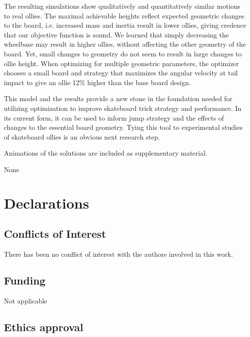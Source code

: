 \documentclass[default,iicol,pdflatex]{sn-jnl}
\begin{document}
The resulting simulations show qualitatively and quantitatively similar motions to real ollies. The maximal achievable heights reflect expected geometric changes to the board, i.e. increased mass and inertia result in lower ollies, giving credence that our objective function is sound. We learned that simply decreasing the wheelbase may result in higher ollies, without affecting the other geometry of the board. Yet, small changes to geometry do not seem to result in large changes to ollie height. When optimizing for multiple geometric parameters, the optimizer chooses a small board and strategy that maximizes the angular velocity at tail impact to give an ollie 12\% higher than the base board design.

This model and the results provide a new stone in the foundation needed for utilizing optimization to improve skateboard trick strategy and performance. In its current form, it can be used to inform jump strategy and the effects of changes to the essential board geometry. Tying this tool to experimental studies of skateboard ollies is an obvious next research step.

\backmatter


Animations of the solutions are included as supplementary material.


None

\section*{Declarations}

\subsection*{Conflicts of Interest}

There has been no conflict of interest with the authors involved in this work.

\subsection*{Funding}

Not applicable

\subsection*{Ethics approval}
\end{document}
